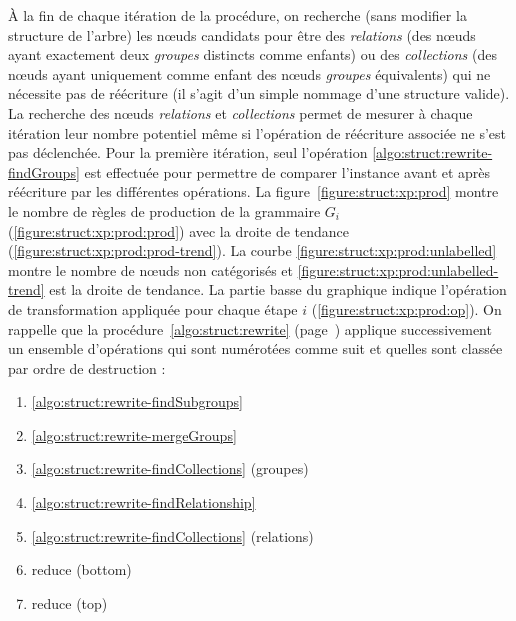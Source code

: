 À la fin de chaque itération de la procédure, on recherche (sans modifier la structure de l'arbre) les nœuds candidats pour être des \emph{relations} (des nœuds ayant exactement deux \emph{groupes} distincts comme enfants) ou des \emph{collections} (des nœuds ayant uniquement comme enfant des nœuds \emph{groupes} équivalents) qui ne nécessite pas de réécriture (il s'agit d'un simple nommage d'une structure valide).
La recherche des nœuds \emph{relations} et \emph{collections} permet de mesurer à chaque itération leur nombre potentiel même si l'opération de réécriture associée ne s'est pas déclenchée.
Pour la première itération, seul l'opération \ref{algo:struct:rewrite-findGroups} est effectuée pour permettre de comparer l'instance avant et après réécriture par les différentes opérations.
La figure~\ref{figure:struct:xp:prod} montre le nombre de règles de production de la grammaire $G_i$ (\ref{figure:struct:xp:prod:prod}) avec la droite de tendance (\ref{figure:struct:xp:prod:prod-trend}).
La courbe \ref{figure:struct:xp:prod:unlabelled} montre le nombre de nœuds non catégorisés et \ref{figure:struct:xp:prod:unlabelled-trend} est la droite de tendance.
La partie basse du graphique indique l'opération de transformation appliquée pour chaque étape $i$ (\ref{figure:struct:xp:prod:op}).
On rappelle que la procédure~\ref{algo:struct:rewrite} (page~\pageref{algo:struct:rewrite}) applique successivement un ensemble d'opérations qui sont numérotées comme suit et quelles sont classée par ordre de destruction :
\begin{multicols}{2}
    \begin{enumerate}
        \item \ref{algo:struct:rewrite-findSubgroups}
        \item \ref{algo:struct:rewrite-mergeGroups}
        \item \ref{algo:struct:rewrite-findCollections} (groupes)
        \item \ref{algo:struct:rewrite-findRelationship}
        \item \ref{algo:struct:rewrite-findCollections} (relations)
        \item \textsf{reduce} (bottom)
        \item \textsf{reduce} (top)
    \end{enumerate}
\end{multicols}

